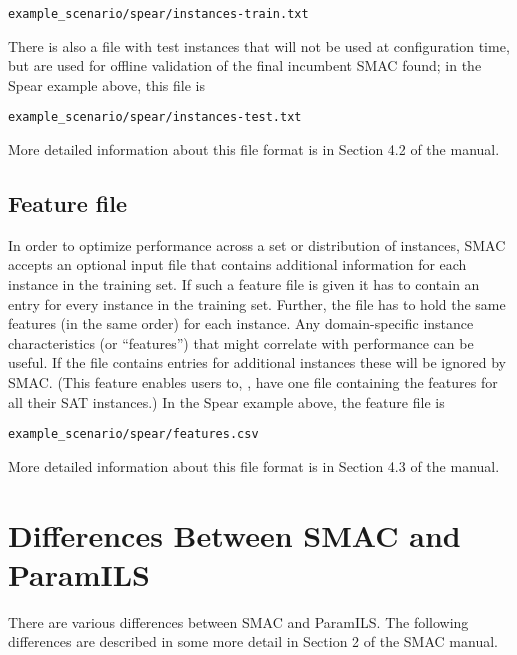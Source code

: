 \documentclass[11pt,letterpaper,twoside]{article}
\begin{document}
{\footnotesize
\begin{alltt}
example_scenario/spear/instances-train.txt
\end{alltt}}

There is also a file with test instances that will not be used at configuration time, but are used for offline validation of the final incumbent SMAC found; in the Spear example above, this file is

{\footnotesize
\begin{alltt}
example_scenario/spear/instances-test.txt
\end{alltt}}

More detailed information about this file format is in Section 4.2 of the manual.

\subsection{Feature file}
In order to optimize performance across a set or distribution of instances, SMAC accepts an optional input file that contains additional information for each instance in the training set. If such a feature file is given it has to contain an entry for every instance in the training set. Further, the file has to hold the same features (in the same order) for each instance.
Any domain-specific instance characteristics (or ``features'') that might correlate with performance can be useful. If the file contains entries for additional instances these will be ignored by SMAC. (This feature enables users to, \eg{}, have one file containing the features for all their SAT instances.) In the Spear example above, the feature file is

{\footnotesize
\begin{alltt}
example_scenario/spear/features.csv
\end{alltt}}

More detailed information about this file format is in Section 4.3 of the manual.
 
\section{Differences Between SMAC and ParamILS}

There are various differences between SMAC and ParamILS. The following differences are described in some more detail in Section 2 of the SMAC manual.
\end{document}
